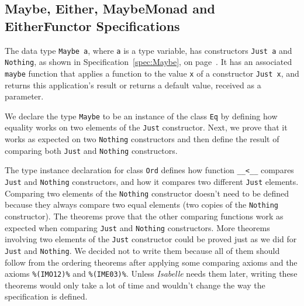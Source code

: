 \documentclass[12pt,twoside]{article}
\numberwithin{spec}{subsection}
\numberwithin{proof}{subsection}
\numberwithin{figure}{subsection}
\numberwithin{code}{subsection}
\newcommand{\citeSpec}[1]{Specification~\ref{#1}, on page~\pageref{#1}}
\newcommand{\axiom}[1]{{\tt \%(#1)\%}}
\begin{document}
\subsection{Maybe, Either, MaybeMonad and EitherFunctor Specifications}
The data type \verb.Maybe a., where \verb.a. is a type variable, has constructors \verb.Just a. and \verb.Nothing., as shown in \citeSpec{spec:Maybe}. It has an associated \verb.maybe. function that applies a function to the value \verb.x. of a constructor \verb.Just x., and returns this application's result or returns a default value, received as a parameter.

We declare the type \verb.Maybe. to be an instance of the class \verb.Eq. by defining how equality works on two elements of the \verb.Just. constructor. Next, we prove that it works as expected on two \verb.Nothing. constructors and then define the result of comparing both \verb.Just. and \verb.Nothing. constructors.

The type instance declaration for class \verb.Ord. defines how function \verb.__<__. compares \verb.Just. and \verb.Nothing. constructors, and  how it compares two different \verb.Just. elements. Comparing two elements of the \verb.Nothing. constructor doesn't need to be defined because they always compare two equal elements (two copies of the \verb.Nothing. constructor). The theorems prove that the other comparing functions work as expected when comparing \verb.Just. and \verb.Nothing. constructors. More theorems involving two elements of the \verb.Just. constructor could be proved just as we did for \verb.Just. and \verb.Nothing.. We decided not to write them because all of them should follow from the ordering theorems after applying some comparing axioms and the axioms \axiom{IMO12} and \axiom{IME03}. Unless \textit{Isabelle} needs them later, writing these theorems would only take a lot of time and wouldn't change the way the specification is defined.
\end{document}
